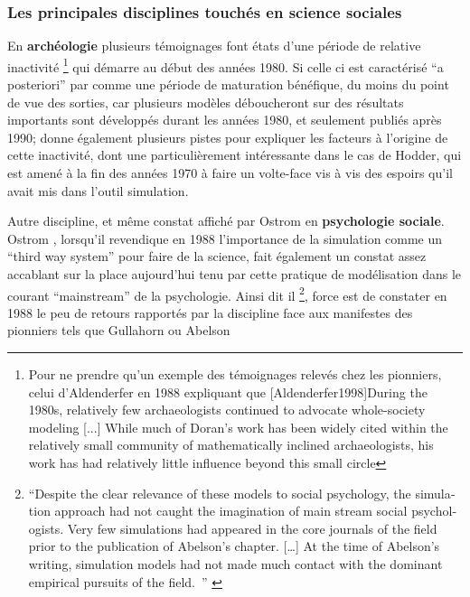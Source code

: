 \subsubsection{Les principales disciplines touchés en science sociales}

En \textbf{archéologie} plusieurs témoignages \autocite[6-7]{Lake2013} font états d'une période de relative inactivité \footnote{Pour ne prendre qu'un exemple des témoignages relevés chez les pionniers, celui d'Aldenderfer en 1988 expliquant que [Aldenderfer1998]{During the 1980s, relatively few archaeologists continued to advocate whole-society modeling [...] While much of Doran's work has been widely cited within the relatively small community of mathematically inclined archaeologists, his work has had relatively little influence beyond this small circle}} qui démarre au début des années 1980. Si celle ci est caractérisé \enquote{a posteriori} par \autocite{Lake2013} comme une période de maturation bénéfique, du moins du point de vue des sorties, car plusieurs modèles déboucheront sur des résultats importants sont développés durant les années 1980, et seulement publiés après 1990; \autocite{Lake2013} donne également plusieurs pistes pour expliquer les facteurs à l'origine de cette inactivité, dont une particulièrement intéressante dans le cas de Hodder, qui est amené à la fin des années 1970 à faire un volte-face vis à vis des espoirs qu'il avait mis dans l'outil simulation.

Autre discipline, et même constat affiché par Ostrom en \textbf{psychologie sociale}. Ostrom \autocite{Ostrom1988}, lorsqu'il revendique en 1988 l'importance de la simulation comme un \foreignquote{english}{third way system} pour faire de la science,  fait également un constat assez accablant sur la place aujourd'hui tenu par cette pratique de modélisation dans le courant \foreignquote{english}{mainstream} de la psychologie. Ainsi dit il \footnote{ \foreignquote{english}{Despite the clear relevance of these models to  social psychology, the simulation approach had not caught the imagination of main stream social psychologists. Very few simulations had appeared in the core journals of the field prior to the publication of Abelson's chapter. […] At the time of Abelson's writing, simulation models had not made much contact with the dominant empirical pursuits of the field. } \autocite[382]{Ostrom1988}}, force est de constater en 1988 le peu de retours rapportés par la discipline face aux manifestes des pionniers tels que Gullahorn \autocite{Gullahorn1965} ou Abelson \autocite{Abelson1968} 

